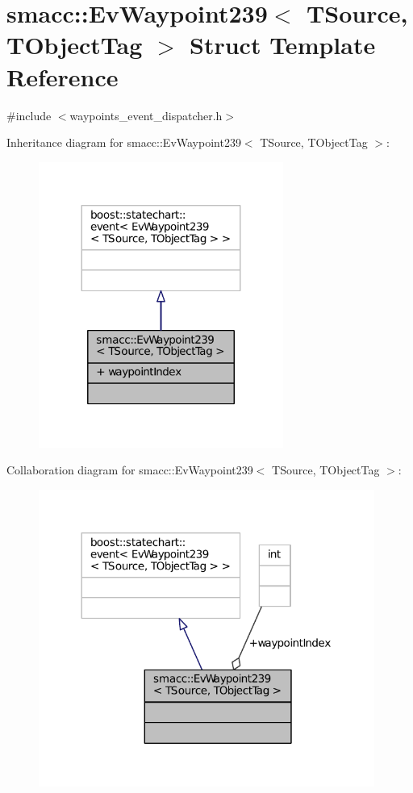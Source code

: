\hypertarget{structsmacc_1_1EvWaypoint239}{}\section{smacc\+:\+:Ev\+Waypoint239$<$ T\+Source, T\+Object\+Tag $>$ Struct Template Reference}
\label{structsmacc_1_1EvWaypoint239}


{\ttfamily \#include $<$waypoints\+\_\+event\+\_\+dispatcher.\+h$>$}



Inheritance diagram for smacc\+:\+:Ev\+Waypoint239$<$ T\+Source, T\+Object\+Tag $>$\+:
\nopagebreak
\begin{figure}[H]
\begin{center}
\leavevmode
\includegraphics[width=227pt]{structsmacc_1_1EvWaypoint239__inherit__graph}
\end{center}
\end{figure}


Collaboration diagram for smacc\+:\+:Ev\+Waypoint239$<$ T\+Source, T\+Object\+Tag $>$\+:
\nopagebreak
\begin{figure}[H]
\begin{center}
\leavevmode
\includegraphics[width=312pt]{structsmacc_1_1EvWaypoint239__coll__graph}
\end{center}
\end{figure}
